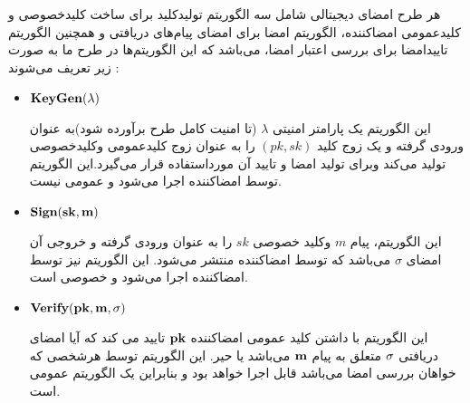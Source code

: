  هر طرح امضای دیجیتالی شامل سه الگوریتم تولیدکلید
برای ساخت کلیدخصوصی و کلیدعمومی امضاکننده، الگوریتم امضا
برای امضای پیام‌های دریافتی و همچنین الگوریتم تایید‌امضا
برای بررسی اعتبار امضا، می‌باشد که این الگوریتم‌ها در طرح ما به صورت زیر تعریف می‌‌شوند :
\begin{itemize}
\item{
$\bf KeyGen(\lambda)$
}
		
این الگوریتم یک پارامتر امنیتی 
$\lambda$
(تا امنیت کامل طرح برآورده شود)به عنوان ورودی گرفته و یک زوج کلید 
$(pk,sk)$
را به عنوان زوج کلیدعمومی وکلیدخصوصی تولید می‌کند وبرای تولید امضا و تایید آن مورداستفاده قرار می‌گیرد.این الگوریتم توسط امضاکننده اجرا می‌شود و عمومی نیست.
\item {
$\bf Sign(sk,m)$	
}

این الگوریتم، پیام
$m$
وکلید خصوصی
$sk$
را به عنوان ورودی گرفته و خروجی آن امضای 
$\sigma$
می‌باشد که توسط امضاکننده منتشر می‌شود. این الگوریتم نیز توسط امضاکننده اجرا می‌شود و خصوصی است.
\item{
$\bf Verify(pk,m,\sigma)$
}

این الگوریتم با داشتن کلید عمومی امضاکننده 
$\bf pk $
تایید می کند که آیا امضای دریافتی 
$\bf \sigma $
متعلق به پیام 
$\bf m $
می‌باشد یا حیر. این الگوریتم توسط هرشخصی که خواهان بررسی امضا می‌باشد قابل اجرا خواهد بود و بنابراین یک الگوریتم عمومی است.
\end{itemize}

